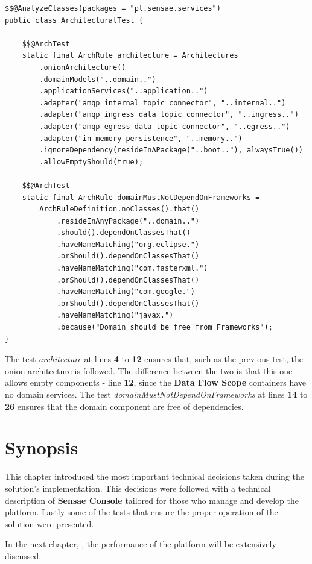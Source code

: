 \begin{lstlisting}[style=Java, caption=Architectural Test - Simplified Onion Architecture - \textbf{Data Processor Flow}, label={code:implementation:tests:arch2}]
$$@AnalyzeClasses(packages = "pt.sensae.services")
public class ArchitecturalTest {

    $$@ArchTest
    static final ArchRule architecture = Architectures
        .onionArchitecture()
        .domainModels("..domain..")
        .applicationServices("..application..")
        .adapter("amqp internal topic connector", "..internal..")
        .adapter("amqp ingress data topic connector", "..ingress..")
        .adapter("amqp egress data topic connector", "..egress..")
        .adapter("in memory persistence", "..memory..")
        .ignoreDependency(resideInAPackage("..boot.."), alwaysTrue())
        .allowEmptyShould(true);

    $$@ArchTest
    static final ArchRule domainMustNotDependOnFrameworks =
        ArchRuleDefinition.noClasses().that()
            .resideInAnyPackage("..domain..")
            .should().dependOnClassesThat()
            .haveNameMatching("org.eclipse.")
            .orShould().dependOnClassesThat()
            .haveNameMatching("com.fasterxml.")
            .orShould().dependOnClassesThat()
            .haveNameMatching("com.google.")
            .orShould().dependOnClassesThat()
            .haveNameMatching("javax.")
            .because("Domain should be free from Frameworks");
}
\end{lstlisting}

The test \textit{architecture} at lines \textbf{4} to \textbf{12} ensures that, such as the previous test, the onion architecture is followed. The difference between the two is that this one allows empty components - line \textbf{12}, since the \textbf{Data Flow Scope} containers have no domain services. The test \textit{domainMustNotDependOnFrameworks} at lines \textbf{14} to \textbf{26} ensures that the domain component are free of dependencies.

\section{Synopsis}
\label{sec:implementation:synopsis}

This chapter introduced the most important technical decisions taken during the solution's implementation. This decisions were followed with a technical description of \textbf{Sensae Console} tailored for those who manage and develop the platform.
Lastly some of the tests that ensure the proper operation of the solution were presented.

In the next chapter, , the performance of the platform will be extensively discussed.
